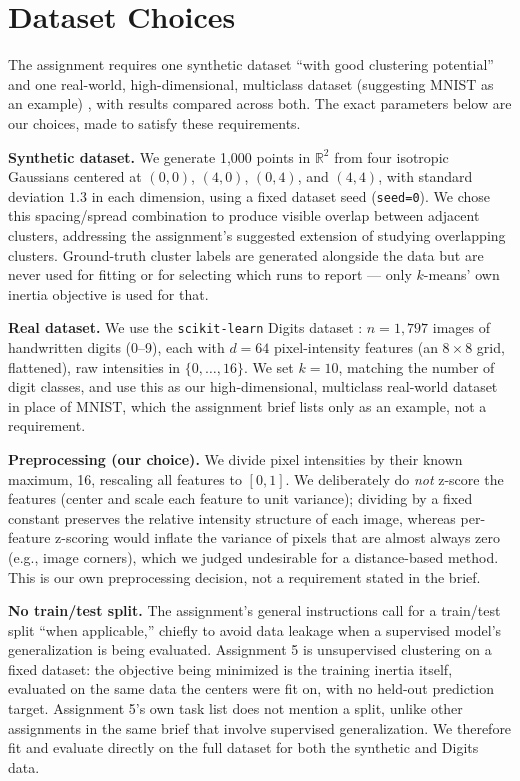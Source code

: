\documentclass[a4paper,11pt]{article}
\begin{document}
\section{Dataset Choices}
\label{sec:datasets}

The assignment requires one synthetic dataset ``with good clustering potential'' and one
real-world, high-dimensional, multiclass dataset (suggesting MNIST as an example)
\cite{smml_assignment5}, with results compared across both. The exact parameters below are
our choices, made to satisfy these requirements.

\textbf{Synthetic dataset.} We generate 1{,}000 points in $\mathbb{R}^2$ from four isotropic
Gaussians centered at $(0,0)$, $(4,0)$, $(0,4)$, and $(4,4)$, with standard deviation $1.3$ in
each dimension, using a fixed dataset seed (\texttt{seed=0}). We chose this spacing/spread
combination to produce visible overlap between adjacent clusters, addressing the
assignment's suggested extension of studying overlapping clusters. Ground-truth cluster
labels are generated alongside the data but are never used for fitting or for selecting which
runs to report --- only $k$-means' own inertia objective is used for that.

\textbf{Real dataset.} We use the \texttt{scikit-learn} Digits dataset \cite{sklearn_digits}:
$n=1{,}797$ images of handwritten digits (0--9), each with $d=64$ pixel-intensity features
(an $8\times8$ grid, flattened), raw intensities in $\{0,\dots,16\}$. We set $k=10$, matching
the number of digit classes, and use this as our high-dimensional, multiclass real-world
dataset in place of MNIST, which the assignment brief lists only as an example, not a
requirement.

\textbf{Preprocessing (our choice).} We divide pixel intensities by their known maximum, 16,
rescaling all features to $[0,1]$. We deliberately do \emph{not} z-score the features
(center and scale each feature to unit variance); dividing by a fixed constant preserves the
relative intensity structure of each image, whereas per-feature z-scoring would inflate the
variance of pixels that are almost always zero (e.g., image corners), which we judged
undesirable for a distance-based method. This is our own preprocessing decision, not a
requirement stated in the brief.

\textbf{No train/test split.} The assignment's general instructions call for a train/test split
``when applicable,'' chiefly to avoid data leakage when a supervised model's generalization is
being evaluated. Assignment 5 is unsupervised clustering on a fixed dataset: the objective
being minimized is the training inertia itself, evaluated on the same data the centers were
fit on, with no held-out prediction target. Assignment 5's own task list does not mention a
split, unlike other assignments in the same brief that involve supervised generalization. We
therefore fit and evaluate directly on the full dataset for both the synthetic and Digits data.
\end{document}
